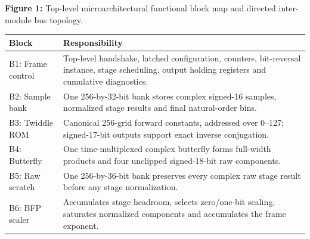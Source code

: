 \documentclass[11pt,a4paper]{article}
\begin{document}
\begin{center}
\par

{\small\textbf{Figure 1:} Top-level microarchitectural functional block map and directed inter-module bus topology.}\end{center}

{\small\renewcommand{\arraystretch}{1.18}\begin{longtable}{@{}L{0.24\textwidth}L{0.7\textwidth}@{}}\toprule

\textbf{Block} & \textbf{Responsibility}\\\midrule\endhead

B1: Frame control & Top-level handshake,\allowbreak{} latched configuration,\allowbreak{} counters,\allowbreak{} bit-reversal instance,\allowbreak{} stage scheduling,\allowbreak{} output holding registers and cumulative diagnostics.\\[3pt]

B2: Sample bank & One 256-by-32-bit bank stores complex signed-16 samples,\allowbreak{} normalized stage results and final natural-order bins.\\[3pt]

B3: Twiddle ROM & Canonical 256-grid forward constants,\allowbreak{} addressed over 0–127; signed-17-bit outputs support exact inverse conjugation.\\[3pt]

B4: Butterfly & One time-multiplexed complex butterfly forms full-width products and four unclipped signed-18-bit raw components.\\[3pt]

B5: Raw scratch & One 256-by-36-bit bank preserves every complex raw stage result before any stage normalization.\\[3pt]

B6: BFP scaler & Accumulates stage headroom,\allowbreak{} selects zero/\allowbreak{}one-bit scaling,\allowbreak{} saturates normalized components and accumulates the frame exponent.\\[3pt]

\bottomrule\end{longtable}}
\end{document}
